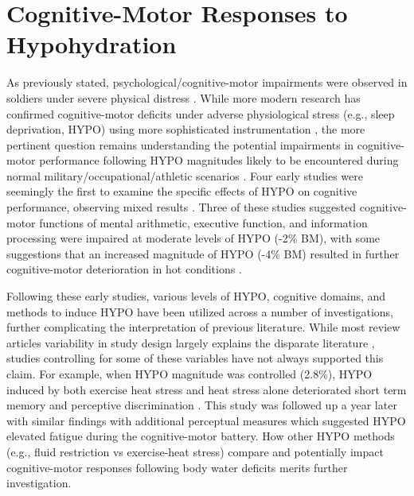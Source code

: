\section{Cognitive-Motor Responses to Hypohydration}
As previously stated, psychological/cognitive-motor impairments were observed in soldiers under severe physical distress \cite{adolf_physiology_1947,king_brief_1878}. While more modern research has confirmed cognitive-motor deficits under adverse physiological stress (e.g., sleep deprivation, HYPO) using more sophisticated instrumentation \cite{lieberman_severe_2005}, the more pertinent question remains understanding the potential impairments in cognitive-motor performance following HYPO magnitudes likely to be encountered during normal military/occupational/athletic scenarios \cite{sawka_american_2007}. Four early studies were seemingly the first to examine the specific effects of HYPO on cognitive performance, observing mixed results \cite{bijlani_effect_1980,sharma_differential_1983,sharma_influence_1986,gopinathan_role_1988}.  Three of these studies suggested cognitive-motor functions of mental arithmetic, executive function, and information processing were impaired at moderate levels of HYPO (-2\% BM), with some suggestions that an increased magnitude of HYPO (-4\% BM) resulted in further cognitive-motor deterioration \cite{gopinathan_role_1988} in hot conditions \cite{sharma_differential_1983,sharma_influence_1986}.    

Following these early studies, various levels of HYPO, cognitive domains, and methods to induce HYPO have been utilized across a number of investigations, further complicating the interpretation of previous literature. While most review articles variability in study design largely explains the disparate literature \cite{masento_effects_2014,grandjean_dehydration_2007}, studies controlling for some of these variables have not always supported this claim. For example, when HYPO magnitude was controlled (2.8\%), HYPO induced by both exercise heat stress and heat stress alone deteriorated short term memory and perceptive discrimination \cite{cian_influence_2000}. This study was followed up a year later \cite{cian_effects_2001} with similar findings with additional perceptual measures which suggested HYPO elevated fatigue during the cognitive-motor battery. How other HYPO methods (e.g., fluid restriction vs exercise-heat stress) compare and potentially impact cognitive-motor responses following body water deficits merits further investigation.

